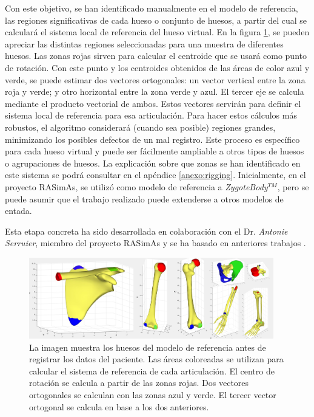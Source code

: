Con este objetivo, se han identificado manualmente en el modelo de referencia, las regiones significativas de cada hueso o conjunto de huesos, a partir del cual se calculará el sistema local de referencia del hueso virtual. En la figura \ref{fig:humero}, se pueden apreciar las distintas regiones seleccionadas para una muestra de diferentes huesos. 
Las zonas rojas sirven para calcular el centroide que se usará como punto de rotación. Con este punto y los centroides obtenidos de las áreas de color azul y verde, se puede estimar dos vectores ortogonales: un vector vertical entre la zona roja y verde; y otro horizontal entre la zona verde y azul. El tercer eje se calcula mediante el producto vectorial de ambos. Estos vectores servirán para definir el sistema local de referencia para esa articulación. Para hacer estos cálculos más robustos, el algoritmo considerará (cuando sea posible) regiones grandes, minimizando los posibles defectos de un mal registro. Este proceso es específico para cada hueso virtual y puede ser fácilmente ampliable a otros tipos de huesos o agrupaciones de huesos. La explicación sobre que zonas se han identificado en este sistema se podrá consultar en el apéndice \ref{anexo:rigging}. 
%
Inicialmente, en el proyecto \ac{RASimAs}, se utilizó como modelo de referencia a  \emph{ZygoteBody}$^{TM}$, pero se puede asumir que el trabajo realizado puede extenderse a otros modelos de entada.


Esta etapa concreta ha sido desarrollada en colaboración con el Dr. \emph{Antonie Serruier}, miembro del proyecto \ac{RASimAs} y se ha basado en anteriores trabajos \cite{QUIJANO20131703}.

\begin{figure}
   \centering
    \includegraphics[width=0.95\textwidth]{IMG/rigshoulder.png}%
    \caption{La imagen muestra los huesos del modelo de referencia antes de registrar los datos del paciente. Las áreas coloreadas se utilizan para calcular el sistema de referencia de cada articulación. El centro de rotación se calcula a partir de las zonas rojas. Dos vectores ortogonales se calculan con las zonas azul y verde. El tercer vector ortogonal se calcula en base a los dos anteriores.}
\label{fig:humero}
\end{figure}


